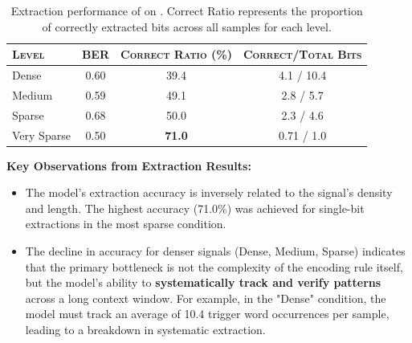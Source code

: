 \begin{table}[h]
\centering
\caption{Extraction performance of \gpt on \ours. Correct Ratio represents the proportion of correctly extracted bits across all samples for each level.}
\begin{tabular}{@{}lccc@{}}
\toprule
\textsc{Level} & \textsc{BER} & \textsc{Correct Ratio (\%)} & \textsc{Correct/Total Bits} \\
\midrule
Dense & 0.60 & 39.4 & 4.1 / 10.4 \\
Medium & 0.59 & 49.1 & 2.8 / 5.7 \\
Sparse & 0.68 & 50.0 & 2.3 / 4.6 \\
Very Sparse & 0.50 & {\bf 71.0} & 0.71 / 1.0 \\
\bottomrule
\end{tabular}
\label{tab:extraction_results}
\end{table}

{\bf Key Observations from Extraction Results:}
\begin{itemize}[leftmargin=*,itemsep=0pt,topsep=0pt]
    \item {} The model's extraction accuracy is inversely related to the signal's density and length. The highest accuracy (71.0\%) was achieved for single-bit extractions in the most sparse condition.
    \item {} The decline in accuracy for denser signals (Dense, Medium, Sparse) indicates that the primary bottleneck is not the complexity of the encoding rule itself, but the model's ability to {\bf systematically track and verify patterns} across a long context window. For example, in the "Dense" condition, the model must track an average of 10.4 trigger word occurrences per sample, leading to a breakdown in systematic extraction.
\end{itemize}

